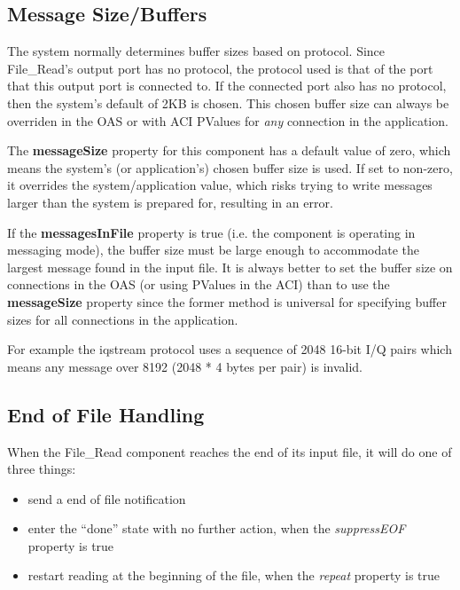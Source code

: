 \documentclass{article}
\begin{document}
\begin{flushleft}
\subsection*{Message Size/Buffers}
The system normally determines buffer sizes based on protocol.  Since File\_Read's output port has no protocol, the protocol used is that of the port that this output port is connected to.  If the connected port also has no protocol, then the system's default of 2KB is chosen.  This chosen buffer size can always be overriden in the OAS or with ACI PValues for \textit{any} connection in the application.\\ \medskip

The \textbf{messageSize} property for this component has a default value of zero, which means the system's (or application's) chosen buffer size is used.  If set to non-zero, it overrides the system/application value, which risks trying to write messages larger than the system is prepared for, resulting in an error.\\ \medskip

If the \textbf{messagesInFile} property is true (i.e. the component is operating in messaging mode), the buffer size must be large enough to accommodate the largest message found in the input file.  It is always better to set the buffer size on connections in the OAS (or using PValues in the ACI) than to use the \textbf{messageSize} property since the former method is universal for specifying buffer sizes for all connections in the application.\\ \medskip

For example the iqstream protocol uses a sequence of 2048 16-bit I/Q pairs which means any message over 8192 (2048 * 4 bytes per pair) is invalid.
\subsection*{End of File Handling}
When the File\_Read component reaches the end of its input file, it will do one of three
things:
\begin{itemize}
  \item send a end of file notification
  \item enter the ``done'' state with no further action, when the \textit{suppressEOF} property
is true
  \item restart reading at the beginning of the file, when the \textit{repeat} property is true
\end{itemize}
\end{flushleft}
\end{document}
